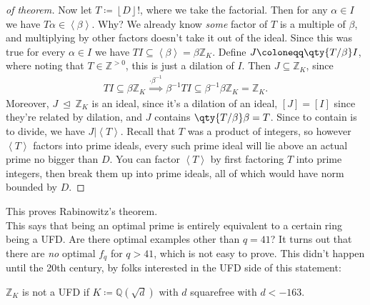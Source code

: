 \begin{proof}[of theorem]
Now let \(T \coloneqq{\left\lfloor D \right\rfloor} !\), where we take
the factorial. Then for any \(\alpha\in I\) we have
\(T \alpha \in \left\langle{ \beta }\right\rangle\). Why? We already
know \emph{some} factor of \(T\) is a multiple of \(\beta\), and
multiplying by other factors doesn't take it out of the ideal. Since
this was true for every \(\alpha\in I\) we have
\(TI \subseteq \left\langle{ \beta }\right\rangle = \beta{\mathbb{Z}}_K\).
Define \(J \coloneqq\qty{T/ \beta} I\), where noting that
\(T\in {\mathbb{Z}}^{> 0}\), this is just a dilation of \(I\). Then
\(J \subseteq {\mathbb{Z}}_K\), since
\begin{align*}
TI \subseteq \beta{\mathbb{Z}}_K \overset{\cdot \beta^{-1}}{\implies } \beta^{-1}T I \subseteq \beta^{-1}\beta {\mathbb{Z}}_K = {\mathbb{Z}}_K
.\end{align*}
Moreover, \(J {~\trianglelefteq~}{\mathbb{Z}}_K\) is an ideal, since
it's a dilation of an ideal, \([J] = [I]\) since they're related by
dilation, and \(J\) contains \(\qty{T / \beta } \beta = T\). Since to
contain is to divide, we have
\(J \mathrel{\Big|}\left\langle{ T }\right\rangle\). Recall that \(T\)
was a product of integers, so however \(\left\langle{ T }\right\rangle\)
factors into prime ideals, every such prime ideal will lie above an
actual prime no bigger than \(D\). You can factor
\(\left\langle{ T }\right\rangle\) by first factoring \(T\) into prime
integers, then break them up into prime ideals, all of which would have
norm bounded by \(D\).

\end{proof}

\begin{remark}

\end{remark}

\begin{remark}

This proves Rabinowitz's theorem.\\

This says that being an optimal prime is entirely equivalent to a
certain ring being a UFD. Are there optimal examples other than
\(q=41\)? It turns out that there are \emph{no} optimal \(f_q\) for
\(q>41\), which is not easy to prove. This didn't happen until the 20th
century, by folks interested in the UFD side of this statement:

\end{remark}

\begin{theorem}

\({\mathbb{Z}}_K\) is not a UFD if
\(K \coloneqq{\mathbb{Q}}( \sqrt{d} )\) with \(d\) squarefree with
\(d<-163\).

\end{theorem}

